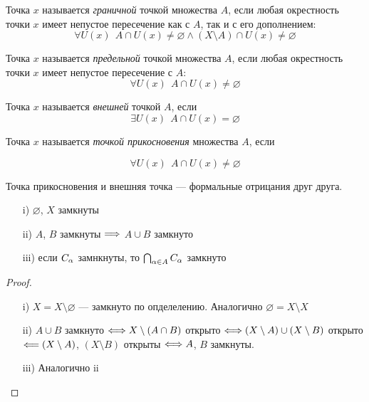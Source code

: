 \begin{definition}
    Точка $x$ называется \textit{граничной} точкой множества $A$, если любая окрестность
    точки $x$ имеет непустое пересечение как с $A$, так и с его дополнением:
\[
    \forall U(x)~~ A \cap U(x) \neq \varnothing \wedge (X \setminus A) \cap U(x)
    \neq \varnothing
\]
\end{definition}

\begin{definition}
    Точка $x$ называется \textit{предельной} точкой множества $A$, если любая
    окрестность точки $x$ имеет непустое пересечение с $A$:
\[
    \forall U(x)~~ A \cap U(x) \neq \varnothing
\]
\end{definition}

\begin{definition}
    Точка $x$ называется \textit{внешней} точкой $A$, если
\[
    \exists U(x)~~ A \cap U(x) = \varnothing
\]
\end{definition}

\begin{definition}
    Точка $x$ называется \textit{точкой прикосновения} множества $A$, если
\end{definition}
\[
    \forall U(x)~~ A \cap U(x) \neq \varnothing
\]

\begin{remark}
    Точка прикосновения и внешняя точка --- формальные отрицания друг друга.
\end{remark}

\begin{theorem}
    \enewline
    \begin{itemize}
        \item[i)] $\varnothing$, $X$ замкнуты
        \item[ii)] $A$, $B$ замкнуты $\Longrightarrow$ $A \cup B$ замкнуто
        \item[iii)] если $C_\alpha$ замнкнуты, то $\bigcap_{\alpha \in A}{C_\alpha}$ замкнуто
    \end{itemize}
\end{theorem}
\begin{proof}
    \enewline
    \begin{itemize}
        \item[i)] $X = X \setminus \varnothing$ --- замкнуто по опделелению.
        Аналогично $\varnothing = X \setminus X$
        \item[ii)] $A \cup B$ замкнуто $\Longleftrightarrow X \setminus (A \cap B)$ открыто
        $\Longleftrightarrow (X \setminus A) \cup (X \setminus B)$ открыто $\Longleftarrow (X \setminus
        A)$, $(X \setminus B)$ открыты $\Longleftrightarrow A$, $B$ замкнуты.
        \item[iii)] Аналогично ii
    \end{itemize}
\end{proof}

